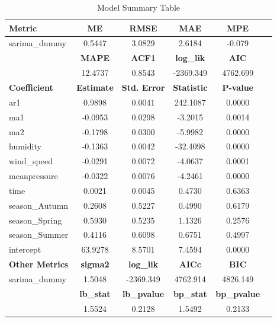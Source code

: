 \documentclass{article}
\begin{document}
\begin{table}[!h]
    \centering
    \caption{Model Summary Table}
    \label{tab:model_summary_combined}
    \begin{tabular}{lccccc}
    \toprule
    \textbf{Metric} & \textbf{ME} & \textbf{RMSE} & \textbf{MAE} & \textbf{MPE} \\
    \midrule
    \multirow{2}{*}{sarima\_dummy} 
        & 0.5447 & 3.0829 & 2.6184 & -0.079 \\
        \cmidrule{2-5}
        & \textbf{MAPE} & \textbf{ACF1} & \textbf{log\_lik} & \textbf{AIC} \\
    \cmidrule{2-5}
        & 12.4737 & 0.8543 & -2369.349 & 4762.699 \\
    \midrule
    \textbf{Coefficient} & \textbf{Estimate} & \textbf{Std. Error} & \textbf{Statistic} & \textbf{P-value} \\
    \cmidrule{1-5}
    ar1            & 0.9898  & 0.0041 & 242.1087 & 0.0000 \\
    ma1            & -0.0953 & 0.0298 & -3.2015  & 0.0014 \\
    ma2            & -0.1798 & 0.0300 & -5.9982  & 0.0000 \\
    humidity       & -0.1363 & 0.0042 & -32.4098 & 0.0000 \\
    wind\_speed    & -0.0291 & 0.0072 & -4.0637  & 0.0001 \\
    meanpressure   & -0.0322 & 0.0076 & -4.2461  & 0.0000 \\
    time           & 0.0021  & 0.0045 & 0.4730   & 0.6363 \\
    season\_Autumn & 0.2608  & 0.5227 & 0.4990   & 0.6179 \\
    season\_Spring & 0.5930  & 0.5235 & 1.1326   & 0.2576 \\
    season\_Summer & 0.4116  & 0.6098 & 0.6751   & 0.4997 \\
    intercept      & 63.9278 & 8.5701 & 7.4594   & 0.0000 \\
    \midrule
    \textbf{Other Metrics} & \textbf{sigma2} & \textbf{log\_lik} & \textbf{AICc} & \textbf{BIC} \\
    \cmidrule{1-5}
    \multirow{2}{*}{sarima\_dummy} & 1.5048 & -2369.349 & 4762.914 & 4826.149  \\
    \cmidrule{2-5}
     & \textbf{lb\_stat} & \textbf{lb\_pvalue} & \textbf{bp\_stat} & \textbf{bp\_pvalue} \\
     \cmidrule{2-5}
     & 1.5524 & 0.2128 & 1.5492 & 0.2133 \\
    \bottomrule
    \end{tabular}
\end{table}


\end{document}
